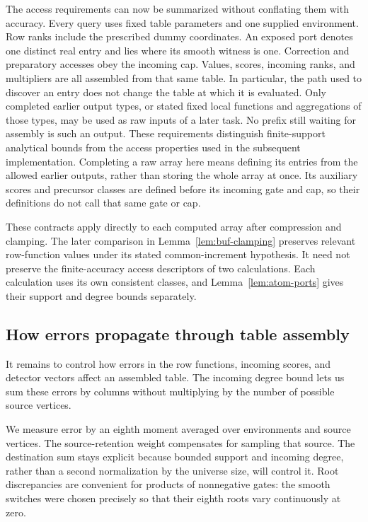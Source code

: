 \documentclass[11pt]{article}
\numberwithin{equation}{section}
\theoremstyle{definition}
\theoremstyle{remark}
\begin{document}
The access requirements can now be summarized without conflating them with accuracy. Every query uses fixed table parameters and one supplied environment. Row ranks include the prescribed dummy coordinates. An exposed port denotes one distinct real entry and lies where its smooth witness is one. Correction and preparatory accesses obey the incoming cap. Values, scores, incoming ranks, and multipliers are all assembled from that same table. In particular, the path used to discover an entry does not change the table at which it is evaluated.  Only completed earlier output types, or stated fixed local
functions and aggregations of those types, may be used as raw inputs of
a later task.  No prefix still waiting for assembly is such an output.
These requirements distinguish finite-support analytical bounds from
the access properties used in the subsequent implementation.
Completing a raw array here means defining its entries from the allowed
earlier outputs, rather than storing the whole array at once.  Its
auxiliary scores and precursor classes are defined before its incoming
gate and cap, so their definitions do not call that same gate or cap.

These contracts apply directly to each computed array after compression
and clamping.  The later comparison in Lemma~\ref{lem:buf-clamping}
preserves relevant row-function values under its stated common-increment
hypothesis.  It need not preserve the finite-accuracy access descriptors
of two calculations.  Each calculation uses its own consistent classes,
and Lemma~\ref{lem:atom-ports} gives their support and degree bounds
separately.

\subsection{How errors propagate through table assembly}

It remains to control how errors in the row functions, incoming scores,
and detector vectors affect an assembled table.  The incoming degree
bound lets us sum these errors by columns without multiplying by the
number of possible source vertices.

We measure error by an eighth moment averaged over environments and source vertices. The source-retention weight compensates for sampling that source. The destination sum stays explicit because bounded support and incoming degree, rather than a second normalization by the universe size, will control it. Root discrepancies are convenient for products of nonnegative gates: the smooth switches were chosen precisely so that their eighth roots vary continuously at zero.
\end{document}
